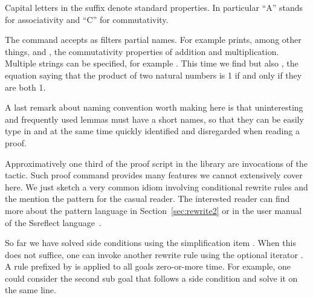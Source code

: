Capital letters in the suffix denote standard properties.
In particular ``A'' stands for associativity and
``C'' for commutativity.

The  command accepts as filters partial names.  For example
 prints, among other things,  and ,
the commutativity properties of addition and multiplication.  Multiple
strings can be specified, for example .  This time
we find  but also , the equation saying that
the product of two natural numbers is 1 if and only if they are both 1.


% 
% 

A last remark about naming convention worth making here
is that uninteresting and frequently used lemmas must have a
short names, so that they can be easily type in and at the same
time quickly identified and disregarded when reading a proof.

\label{sec:rewrite2}

Approximatively one third of the proof script in the \mcbMC{} library are
invocations of the  tactic.  Such proof command provides many
features we cannot extensively cover here.  We just sketch a very common idiom
involving conditional rewrite rules and the mention the  pattern for
the casual reader.  The interested reader can find more about the pattern
language in Section~\ref{sec:rewrite2} or in the user manual of the
Ssreflect language~\cite{ssrman}.

So far we have solved side conditions using the simplification item \C{//}.
When this does not suffice, one can invoke another rewrite rule using
the optional iterator .  A rule prefixed by  is applied to
all goals zero-or-more time.  For example, one could consider the
second sub goal that follows  a side condition
and solve it on the same line.

